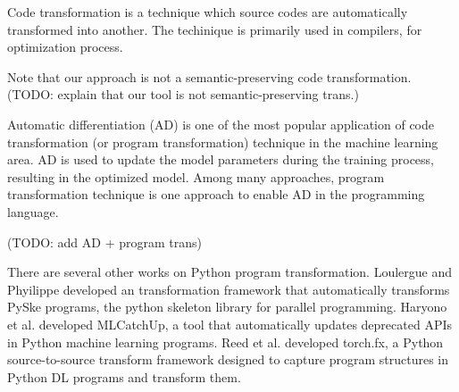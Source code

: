 Code transformation is a technique which source codes are automatically
transformed into another. The techinique is primarily used in compilers,
for optimization process. 

Note that our approach is not a semantic-preserving code transformation.
(TODO: explain that our tool is not semantic-preserving trans.)

Automatic differentiation (AD) is one of the most popular application of
code transformation (or program transformation) technique
in the machine learning area.  
AD is used to update the model parameters during the training process,
resulting in the optimized model.
Among many approaches, program transformation technique is one approach
to enable AD in the programming language.

(TODO: add AD + program trans)

There are several other works on Python program transformation.
Loulergue and Phyilippe\cite{Loulergue2020} developed an
transformation framework that automatically transforms PySke programs, 
the python skeleton library for parallel programming.
Haryono et al. \cite{mlcatchup} developed MLCatchUp,
a tool that automatically updates deprecated APIs in Python machine learning
programs. Reed et al. \cite{torchfx} developed torch.fx,
a Python source-to-source transform framework designed to capture
program structures in Python DL programs and transform them. 
